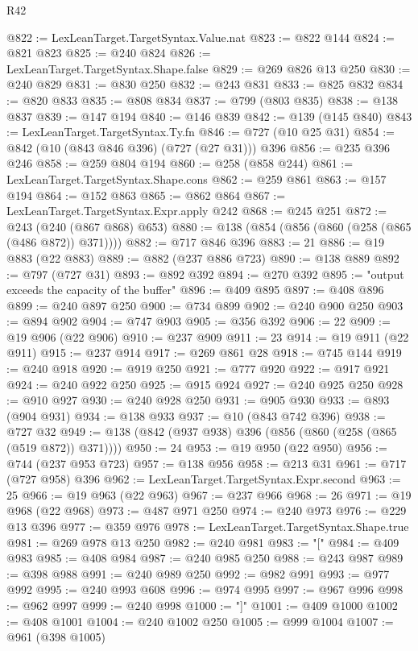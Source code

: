 \begin{lexlean}{R42}
\begin{coremodule}
@822 := LexLeanTarget.TargetSyntax.Value.nat
@823 := @822 @144
@824 := @821 @823
@825 := @240 @824
@826 := LexLeanTarget.TargetSyntax.Shape.false
@829 := @269 @826 @13 @250
@830 := @240 @829
@831 := @830 @250
@832 := @243 @831
@833 := @825 @832
@834 := @820 @833
@835 := @808 @834
@837 := @799 (@803 @835)
@838 := @138 @837
@839 := @147 @194
@840 := @146 @839
@842 := @139 (@145 @840)
@843 := LexLeanTarget.TargetSyntax.Ty.fn
@846 := @727 (@10 @25 @31)
@854 := @842 (@10 (@843 @846 @396) (@727 (@27 @31))) @396
@856 := @235 @396 @246
@858 := @259 @804 @194
@860 := @258 (@858 @244)
@861 := LexLeanTarget.TargetSyntax.Shape.cons
@862 := @259 @861
@863 := @157 @194
@864 := @152 @863
@865 := @862 @864
@867 := LexLeanTarget.TargetSyntax.Expr.apply @242
@868 := @245 @251
@872 := @243 (@240 (@867 @868) @653)
@880 := @138 (@854 (@856 (@860 (@258 (@865 (@486 @872)) @371))))
@882 := @717 @846 @396
@883 := 21
@886 := @19 @883 (@22 @883)
@889 := @882 (@237 @886 @723)
@890 := @138 @889
@892 := @797 (@727 @31)
@893 := @892 @392
@894 := @270 @392
@895 := "output exceeds the capacity of the buffer"
@896 := @409 @895
@897 := @408 @896
@899 := @240 @897 @250
@900 := @734 @899
@902 := @240 @900 @250
@903 := @894 @902
@904 := @747 @903
@905 := @356 @392
@906 := 22
@909 := @19 @906 (@22 @906)
@910 := @237 @909
@911 := 23
@914 := @19 @911 (@22 @911)
@915 := @237 @914
@917 := @269 @861 @28
@918 := @745 @144
@919 := @240 @918
@920 := @919 @250
@921 := @777 @920
@922 := @917 @921
@924 := @240 @922 @250
@925 := @915 @924
@927 := @240 @925 @250
@928 := @910 @927
@930 := @240 @928 @250
@931 := @905 @930
@933 := @893 (@904 @931)
@934 := @138 @933
@937 := @10 (@843 @742 @396)
@938 := @727 @32
@949 := @138 (@842 (@937 @938) @396 (@856 (@860 (@258 (@865 (@519 @872)) @371))))
@950 := 24
@953 := @19 @950 (@22 @950)
@956 := @744 (@237 @953 @723)
@957 := @138 @956
@958 := @213 @31
@961 := @717 (@727 @958) @396
@962 := LexLeanTarget.TargetSyntax.Expr.second
@963 := 25
@966 := @19 @963 (@22 @963)
@967 := @237 @966
@968 := 26
@971 := @19 @968 (@22 @968)
@973 := @487 @971 @250
@974 := @240 @973
@976 := @229 @13 @396
@977 := @359 @976
@978 := LexLeanTarget.TargetSyntax.Shape.true
@981 := @269 @978 @13 @250
@982 := @240 @981
@983 := "["
@984 := @409 @983
@985 := @408 @984
@987 := @240 @985 @250
@988 := @243 @987
@989 := @398 @988
@991 := @240 @989 @250
@992 := @982 @991
@993 := @977 @992
@995 := @240 @993 @608
@996 := @974 @995
@997 := @967 @996
@998 := @962 @997
@999 := @240 @998
@1000 := "]"
@1001 := @409 @1000
@1002 := @408 @1001
@1004 := @240 @1002 @250
@1005 := @999 @1004
@1007 := @961 (@398 @1005)

\end{coremodule}
\end{lexlean}
